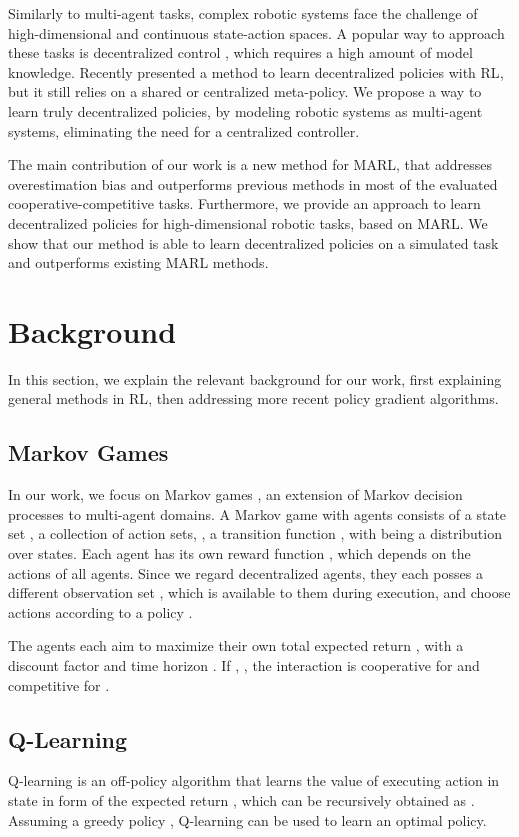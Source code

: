 \documentclass{article}
\begin{document}
Similarly to multi-agent tasks, complex robotic systems face the challenge of high-dimensional and continuous state-action spaces. 
A popular way to approach these tasks is decentralized control \cite{Ijspeert2008}, which requires a high amount of model knowledge.
Recently \cite{Sartoretti2018} presented a method to learn decentralized policies with \gls*{RL}, but it still relies on a shared or centralized meta-policy.
We propose a way to learn truly decentralized policies, by modeling robotic systems as multi-agent systems, eliminating the need for a centralized controller.

The main contribution of our work is a new method for \gls*{MARL}, that addresses overestimation bias and outperforms previous methods in most of the evaluated cooperative-competitive tasks.
Furthermore, we provide an approach to learn decentralized policies for high-dimensional robotic tasks, based on \gls*{MARL}.
We show that our method is able to learn decentralized policies on a simulated task and outperforms existing \gls*{MARL} methods.

\section{Background}
In this section, we explain the relevant background for our work, first explaining general methods in \gls*{RL}, then addressing more recent policy gradient algorithms.
\subsection{Markov Games}
In our work, we focus on Markov games \cite{Littman1994}, an extension of Markov decision processes to multi-agent domains.
A Markov game with  agents consists of a state set , a collection of action sets, , a transition function , with  being a distribution over states.
Each agent has its own reward function , which depends on the actions of all agents.
Since we regard decentralized agents, they each posses a different observation set , which is available to them during execution, and choose actions according to a policy .

The agents each aim to maximize their own total expected return , with a discount factor  and time horizon .
If , , the interaction is cooperative for  and competitive for 	.


\subsection{Q-Learning}
Q-learning \cite{Sutton1998reinforcement} is an off-policy algorithm that learns the value of executing action  in state  in form of the expected return , which can be recursively obtained as .
Assuming a greedy policy , Q-learning can be used to learn an optimal policy.
\end{document}
